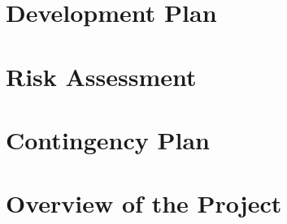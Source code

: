 \documentclass[english,runningheads,a4paper]{llncs}[2018/03/10]
\begin{document}
        \subsubsection*{}



\section*{Development Plan}


\section*{Risk Assessment}


\section*{Contingency Plan}


\section*{Overview of the Project}


\printbibliography
\end{document}
